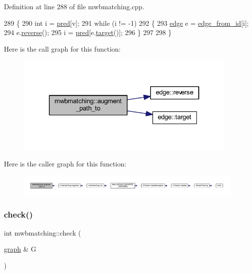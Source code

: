 Definition at line 288 of file mwbmatching.\+cpp.


\begin{DoxyCode}
289 \{
290     \textcolor{keywordtype}{int} i = \mbox{\hyperlink{classmwbmatching_acea3c6ca4ec946e87a2850c2dc20479f}{pred}}[v];
291     \textcolor{keywordflow}{while} (i != -1)
292     \{
293         \mbox{\hyperlink{classedge}{edge}} e = \mbox{\hyperlink{classmwbmatching_afebc731e1dd5a37df6467258bfe07887}{edge\_from\_id}}[i];
294         e.\mbox{\hyperlink{classedge_ad62516eb40dbee9f57a2078cfd97b4c9}{reverse}}();
295         i = \mbox{\hyperlink{classmwbmatching_acea3c6ca4ec946e87a2850c2dc20479f}{pred}}[e.\mbox{\hyperlink{classedge_a97563b611261478ee19c6ce055f1a3ee}{target}}()];
296     \}   
297 
298 \}
\end{DoxyCode}
Here is the call graph for this function\+:\nopagebreak
\begin{figure}[H]
\begin{center}
\leavevmode
\includegraphics[width=310pt]{classmwbmatching_a241fe1b645070b1f3e96c0b100fb8a6f_cgraph}
\end{center}
\end{figure}
Here is the caller graph for this function\+:\nopagebreak
\begin{figure}[H]
\begin{center}
\leavevmode
\includegraphics[width=350pt]{classmwbmatching_a241fe1b645070b1f3e96c0b100fb8a6f_icgraph}
\end{center}
\end{figure}
\mbox{\label{classmwbmatching_af6b9e6ad6e77958ddd32301df96bae23}} 
\subsubsection{\texorpdfstring{check()}{check()}}
{\footnotesize\ttfamily int mwbmatching\+::check (\begin{DoxyParamCaption}\item[{\mbox{\hyperlink{classgraph}{graph}} \&}]{G }\end{DoxyParamCaption})\hspace{0.3cm}{\ttfamily [virtual]}}

